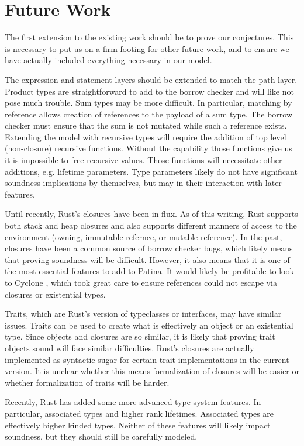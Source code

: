 \section*{Future Work}
The first extension to the existing work should be to prove our conjectures.
This is necessary to put us on a firm footing for other future work, and
to ensure we have actually included everything necessary in our model.

The expression and statement layers should be extended to match the path layer.
Product types are straightforward to add to the borrow checker and will like not
pose much trouble. Sum types may be more difficult. In particular, matching by
reference allows creation of references to the payload of a sum type.
The borrow checker must ensure that the sum is not mutated while such a reference
exists. Extending the model with recursive types will require the addition of
top level (non-closure) recursive functions. Without the capability those functions
give us it is impossible to free recursive values. Those functions will necessitate
other additions, e.g. lifetime parameters. Type parameters likely do not have
significant soundness implications by themselves, but may in their interaction with
later features.

Until recently, Rust's closures have been in flux. As of this writing, Rust supports
both stack and heap closures and also supports different manners of access to the environment
(owning, immutable refernce, or mutable reference). In the past, closures have been a
common source of borrow checker bugs, which likely means that proving soundness will be
difficult. However, it also means that it is one of the most essential features to add to Patina.
It would likely be profitable to look to Cyclone \cite{cycregions}, which took great
care to ensure references could not escape via closures or existential types.

Traits, which are Rust's version of typeclasses or interfaces, may have similar issues.
Traits can be used to create what is effectively an object or an existential type.
Since objects and closures are so similar, it is likely that proving trait objects sound
will face similar difficulties. Rust's closures are actually implemented as syntactic sugar
for certain trait implementations in the current version. 
It is unclear whether this means formalization of closures will be easier
or whether formalization of traits will be harder.

Recently, Rust has added some more advanced type system features.
In particular, associated types and higher rank lifetimes.
Associated types are effectively higher kinded types.
Neither of these features will likely impact soundness, but they should still be
carefully modeled.

